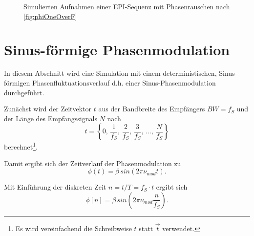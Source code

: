 \begin{figure}[H]
	\hfill
	\hfill
	\caption[($1/f$)-Rauschen (EPI-Sequenz)]{Simulierten Aufnahmen einer EPI-Sequenz mit Phasenrauschen nach \autoref{fig:phiOneOverF}}
	\label{fig:oneOverfEPI}	
\end{figure}





\clearpage
\section{Sinus-förmige Phasenmodulation}
In diesem Abschnitt wird eine Simulation mit einem deterministischen, Sinus-förmigen Phasenfluktuationsverlauf d.h. einer Sinus-Phasenmodulation durchgeführt.

Zunächst wird der Zeitvektor $t$ aus der Bandbreite des Empfängers $BW=f_S$ und der Länge des Empfangssignals $N$ nach
\begin{equation}
	t=\left\{0,\,\frac{1}{f_S},\,\frac{2}{f_S},\,\frac{3}{f_S},\,\dots,\,\frac{N}{f_S}\right\}
\end{equation}
berechnet\footnote{Es wird vereinfachend die Schreibweise $t$ statt $\vec{t}$ verwendet.}.

Damit ergibt sich der Zeitverlauf der Phasenmodulation zu
\begin{equation}
	\phi(t) = \beta\, sin(2\pi \nu_{mod} t).
\end{equation}

Mit Einführung der diskreten Zeit $n = t/T = f_S \cdot t$ ergibt sich
\begin{equation}
	\phi[n] = \beta\, sin(2\pi \nu_{mod} \frac{n}{f_S}).
\end{equation}

